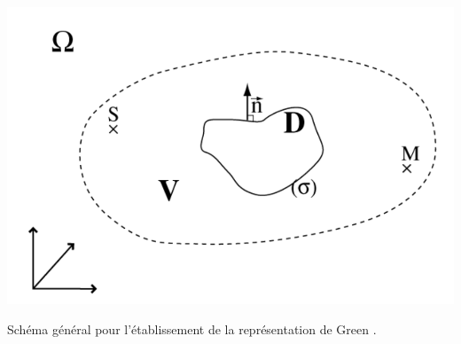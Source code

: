 \begin{figureth}
	\includegraphics[width=0.6\linewidth]{images/green}
	\caption[Schéma général pour l'établissement de la représentation de Green]{Schéma général pour l'établissement de la représentation de Green \footnotemark.}
	\label{schema_green}
\end{figureth}


